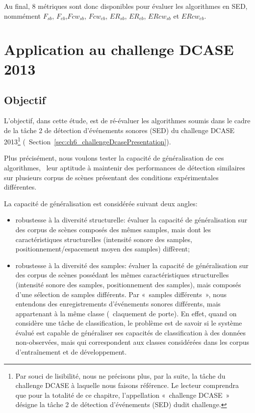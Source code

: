 Au final, 8 métriques sont donc disponibles pour évaluer les algorithmes en SED, nommément $F_{sb}$, $F_{eb}$,$Fcw_{sb}$, $Fcw_{eb}$, $ER_{sb}$, $ER_{eb}$, $ERcw_{sb}$ et $ERcw_{eb}$.


\section{Application au challenge DCASE  2013}
\label{sec:ch5_appDcase2013}

\subsection{Objectif}

L'objectif, dans cette étude, est de ré-évaluer les algorithmes soumis dans le cadre de la tâche 2 de détection d'événements sonores (SED) du challenge DCASE 2013\footnote{Par souci de lisibilité, nous ne précisons plus, par la suite, la tâche du challenge DCASE à laquelle nous faisons référence. Le lecteur comprendra que pour la totalité de ce chapitre, l'appellation «~challenge DCASE~» désigne la tâche 2 de détection d'événements (SED) dudit challenge.} (\cf~Section~\ref{sec:ch6_challengeDcasePresentation}).

Plus précisément, nous voulons tester la capacité de généralisation de ces algorithmes, \ie~leur aptitude à maintenir des performances de détection similaires sur plusieurs corpus de scènes présentant des conditions expérimentales différentes.

La capacité de généralisation est considérée suivant deux angles:

\begin{itemize}
\item robustesse à la diversité structurelle: évaluer la capacité de généralisation sur des corpus de scènes composés des mêmes samples, mais dont les caractéristiques structurelles (intensité sonore des samples, positionnement/espacement moyen des samples) diffèrent;
\item robustesse à la diversité des samples: évaluer la capacité de généralisation sur des corpus de scènes possédant les mêmes caractéristiques structurelles (intensité sonore des samples, positionnement des samples), mais composés d'une sélection de samples différents. Par «~samples différents~», nous entendons des enregistrements d'événements sonores différents, mais appartenant à la même classe (\eg~claquement de porte). En effet, quand on considère une tâche de classification, le problème est de savoir si le système évalué est capable de généraliser ses capacités de classification à des données non-observées, mais qui correspondent aux classes considérées dans les corpus d’entraînement et de développement.
\end{itemize}

